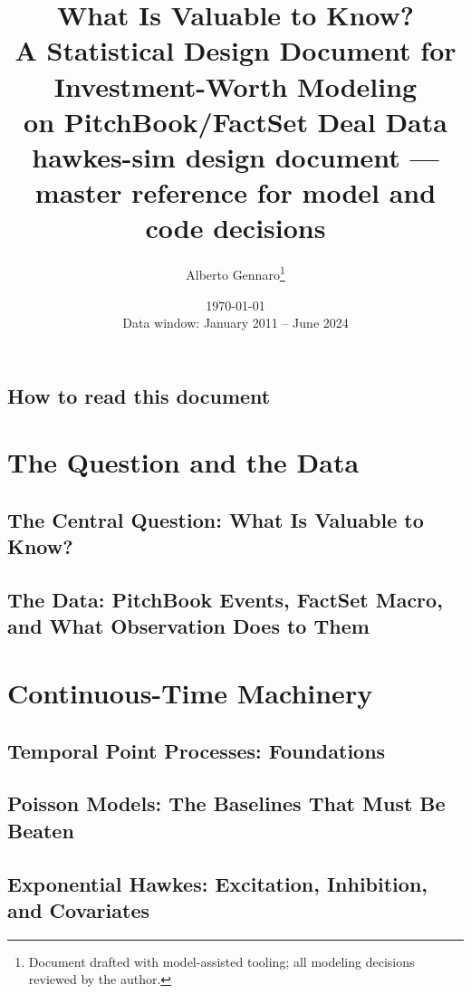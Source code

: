 \documentclass[11pt,a4paper,twoside,openany]{book}
\title{\Huge What Is Valuable to Know?\\[1ex]
\Large A Statistical Design Document for Investment-Worth Modeling\\
on PitchBook/FactSet Deal Data\\[2ex]
\normalsize hawkes-sim design document --- master reference for model and code decisions}
\author{Alberto Gennaro\thanks{Document drafted with model-assisted tooling; all
modeling decisions reviewed by the author.}}
\date{\today\\[1ex]\normalsize Data window: January 2011 -- June 2024}
\theoremstyle{plain}
\theoremstyle{definition}
\theoremstyle{remark}
\begin{document}
\frontmatter
\maketitle

\chapter*{How to read this document}


\tableofcontents

\mainmatter

\part{The Question and the Data}
\chapter{The Central Question: What Is Valuable to Know?}\label{ch:question}


\chapter{The Data: PitchBook Events, FactSet Macro, and What Observation Does to Them}\label{ch:data}


\part{Continuous-Time Machinery}
\chapter{Temporal Point Processes: Foundations}\label{ch:foundations}


\chapter{Poisson Models: The Baselines That Must Be Beaten}\label{ch:poisson}


\chapter{Exponential Hawkes: Excitation, Inhibition, and Covariates}\label{ch:hawkes}

\end{document}
